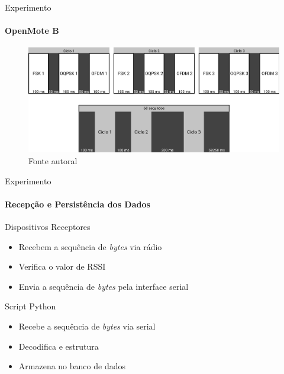 \documentclass[c]{beamer}
\begin{document}
\begin{darkframes}
  \begin{frame}{Experimento}
    \framesubtitle{OpenMote B}
    \begin{figure}
      \centering
      \includegraphics[width=\textwidth]{resources/ciclos.png}\\
      \footnotesize{Fonte autoral}
    \end{figure}
  \end{frame}

  \begin{frame}{Experimento}
    \framesubtitle{Recepção e Persistência dos Dados}
    \begin{block}{Dispositivos Receptores}
      \begin{itemize}
        \item \alert{Recebem} a sequência de \emph{bytes} via rádio
        \item \alert{Verifica} o valor de RSSI
        \item \alert{Envia} a sequência de \emph{bytes} pela interface serial
      \end{itemize}
    \end{block}

    \begin{block}{Script Python}
      \begin{itemize}
        \item \alert{Recebe} a sequência de \emph{bytes} via serial
        \item \alert{Decodifica} e \alert{estrutura}
        \item \alert{Armazena} no banco de dados
      \end{itemize}
    \end{block}
  \end{frame}



\end{darkframes}
\end{document}
